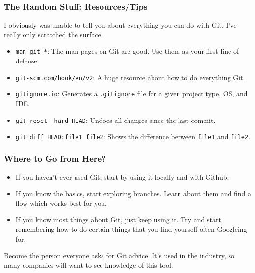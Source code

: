 \documentclass{lug}
\begin{document}
\begin{frame}
    \frametitle{The Random Stuff: Resources/Tips}

    I obviously was unable to tell you about everything you can do with Git. I've really only
    scratched the surface.

    \begin{itemize}
        \item \texttt{man git *}: The man pages on Git are good. Use them as your first line of
            defense.
        \item \texttt{git-scm.com/book/en/v2}: A huge resource about how to do everything Git.
        \item \texttt{gitignore.io}: Generates a \texttt{.gitignore} file for a given project type,
            OS, and IDE.
        \item \texttt{git reset --hard HEAD}: Undoes all changes since the last commit.
        \item \texttt{git diff HEAD:file1 file2}: Shows the difference between \texttt{file1} and
            \texttt{file2}.
    \end{itemize}
\end{frame}

\begin{frame}
    \frametitle{Where to Go from Here?}
    \begin{itemize}[<+->]
        \item If you haven't ever used Git, start by using it locally and with Github.
        \item If you know the basics, start exploring branches. Learn about them and find a flow
            which works best for you.
        \item If you know most things about Git, just keep using it. Try and start remembering how
            to do certain things that you find yourself often Googleing for. 
    \end{itemize}
    Become the person everyone asks for Git advice. It's used in the industry, so many companies
    will want to see knowledge of this tool.
\end{frame}
\end{document}
